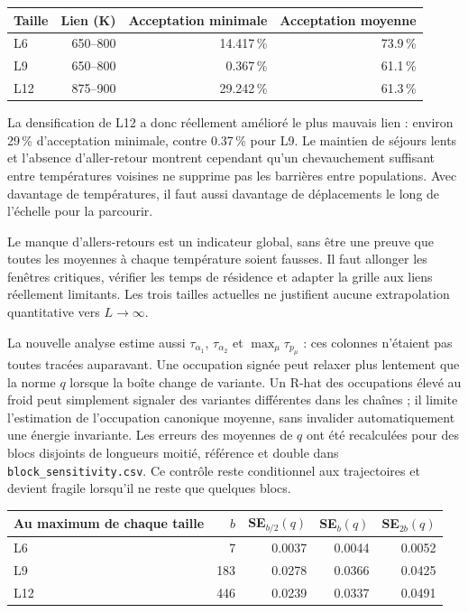 \begin{center}\small\begin{tabular}{lrrr}\toprule

Taille & Lien (K) & Acceptation minimale & Acceptation moyenne\\\midrule

L6 & 650--800 & 14.417\,\% & 73.9\,\%\\

L9 & 650--800 & 0.367\,\% & 61.1\,\%\\

L12 & 875--900 & 29.242\,\% & 61.3\,\%\\

\bottomrule\end{tabular}\end{center}

La densification de L12 a donc réellement amélioré le plus mauvais lien : environ 29\,\% d’acceptation minimale, contre 0.37\,\% pour L9. Le maintien de séjours lents et l’absence d’aller-retour montrent cependant qu’un chevauchement suffisant entre températures voisines ne supprime pas les barrières entre populations. Avec davantage de températures, il faut aussi davantage de déplacements le long de l’échelle pour la parcourir.

Le manque d’allers-retours est un indicateur global, sans être une preuve que toutes les moyennes à chaque température soient fausses. Il faut allonger les fenêtres critiques, vérifier les temps de résidence et adapter la grille aux liens réellement limitants. Les trois tailles actuelles ne justifient aucune extrapolation quantitative vers $L\to\infty$.

La nouvelle analyse estime aussi $\tau_{\alpha_1}$, $\tau_{\alpha_2}$ et $\max_\mu\tau_{p_\mu}$ : ces colonnes n’étaient pas toutes tracées auparavant. Une occupation signée peut relaxer plus lentement que la norme $q$ lorsque la boîte change de variante. Un R-hat des occupations élevé au froid peut simplement signaler des variantes différentes dans les chaînes ; il limite l’estimation de l’occupation canonique moyenne, sans invalider automatiquement une énergie invariante. Les erreurs des moyennes de $q$ ont été recalculées pour des blocs disjoints de longueurs moitié, référence et double dans \texttt{block\_sensitivity.csv}. Ce contrôle reste conditionnel aux trajectoires et devient fragile lorsqu’il ne reste que quelques blocs.

\begin{center}\small\begin{tabular}{lrrrr}\toprule

Au maximum de chaque taille & $b$ & SE$_{b/2}(q)$ & SE$_b(q)$ & SE$_{2b}(q)$\\\midrule

L6 & 7 & 0.0037 & 0.0044 & 0.0052\\

L9 & 183 & 0.0278 & 0.0366 & 0.0425\\

L12 & 446 & 0.0239 & 0.0337 & 0.0491\\

\bottomrule\end{tabular}\end{center}


